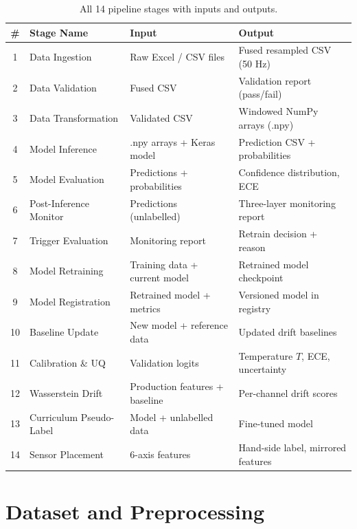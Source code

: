 \begin{table}[ht]
  \centering
  \caption{All 14 pipeline stages with inputs and outputs.}
  \label{tab:all_stages}
  \begin{tabularx}{\linewidth}{clXX}
    \toprule
    \textbf{\#} & \textbf{Stage Name} & \textbf{Input} & \textbf{Output} \\
    \midrule
    1  & Data Ingestion          & Raw Excel / CSV files          & Fused resampled CSV (50 Hz) \\
    2  & Data Validation         & Fused CSV                      & Validation report (pass/fail) \\
    3  & Data Transformation     & Validated CSV                  & Windowed NumPy arrays (.npy) \\
    4  & Model Inference         & .npy arrays + Keras model      & Prediction CSV + probabilities \\
    5  & Model Evaluation        & Predictions + probabilities    & Confidence distribution, ECE \\
    6  & Post-Inference Monitor  & Predictions (unlabelled)       & Three-layer monitoring report \\
    7  & Trigger Evaluation      & Monitoring report              & Retrain decision + reason \\
    8  & Model Retraining        & Training data + current model  & Retrained model checkpoint \\
    9  & Model Registration      & Retrained model + metrics      & Versioned model in registry \\
    10 & Baseline Update         & New model + reference data     & Updated drift baselines \\
    11 & Calibration \& UQ       & Validation logits              & Temperature $T$, ECE, uncertainty \\
    12 & Wasserstein Drift       & Production features + baseline & Per-channel drift scores \\
    13 & Curriculum Pseudo-Label & Model + unlabelled data        & Fine-tuned model \\
    14 & Sensor Placement        & 6-axis features                & Hand-side label, mirrored features \\
    \bottomrule
  \end{tabularx}
\end{table}

\section{Dataset and Preprocessing}
\label{sec:dataset}

